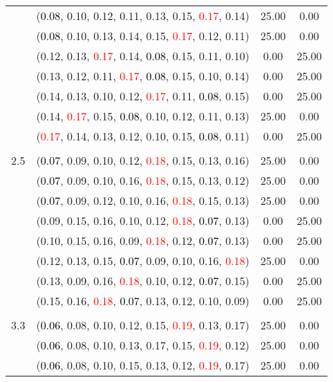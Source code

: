 \documentclass[10pt,a4paper]{report}
\begin{document}
\begin{center}
\begin{longtable}{clcc}
			&(\textcolor{black}{0.08}, 0.10, 0.12, 0.11, 0.13, 0.15, \textcolor{red}{0.17}, 0.14)&25.00&0.00\\
			&(\textcolor{black}{0.08}, 0.10, 0.13, 0.14, 0.15, \textcolor{red}{0.17}, 0.12, 0.11)&25.00&0.00\\
			&(0.12, 0.13, \textcolor{red}{0.17}, 0.14, \textcolor{black}{0.08}, 0.15, 0.11, 0.10)&0.00&25.00\\
			&(0.13, 0.12, 0.11, \textcolor{red}{0.17}, \textcolor{black}{0.08}, 0.15, 0.10, 0.14)&0.00&25.00\\
			&(0.14, 0.13, 0.10, 0.12, \textcolor{red}{0.17}, 0.11, \textcolor{black}{0.08}, 0.15)&0.00&25.00\\
			&(0.14, \textcolor{red}{0.17}, 0.15, \textcolor{black}{0.08}, 0.10, 0.12, 0.11, 0.13)&25.00&0.00\\
			&(\textcolor{red}{0.17}, 0.14, 0.13, 0.12, 0.10, 0.15, \textcolor{black}{0.08}, 0.11)&0.00&25.00\\
		&&&\\
		2.5			&(\textcolor{black}{0.07}, 0.09, 0.10, 0.12, \textcolor{red}{0.18}, 0.15, 0.13, 0.16)&25.00&0.00\\
			&(\textcolor{black}{0.07}, 0.09, 0.10, 0.16, \textcolor{red}{0.18}, 0.15, 0.13, 0.12)&25.00&0.00\\
			&(\textcolor{black}{0.07}, 0.09, 0.12, 0.10, 0.16, \textcolor{red}{0.18}, 0.15, 0.13)&25.00&0.00\\
			&(0.09, 0.15, 0.16, 0.10, 0.12, \textcolor{red}{0.18}, \textcolor{black}{0.07}, 0.13)&0.00&25.00\\
			&(0.10, 0.15, 0.16, 0.09, \textcolor{red}{0.18}, 0.12, \textcolor{black}{0.07}, 0.13)&0.00&25.00\\
			&(0.12, 0.13, 0.15, \textcolor{black}{0.07}, 0.09, 0.10, 0.16, \textcolor{red}{0.18})&25.00&0.00\\
			&(0.13, 0.09, 0.16, \textcolor{red}{0.18}, 0.10, 0.12, \textcolor{black}{0.07}, 0.15)&0.00&25.00\\
			&(0.15, 0.16, \textcolor{red}{0.18}, \textcolor{black}{0.07}, 0.13, 0.12, 0.10, 0.09)&0.00&25.00\\
		&&&\\
		3.3			&(\textcolor{black}{0.06}, 0.08, 0.10, 0.12, 0.15, \textcolor{red}{0.19}, 0.13, 0.17)&25.00&0.00\\
			&(\textcolor{black}{0.06}, 0.08, 0.10, 0.13, 0.17, 0.15, \textcolor{red}{0.19}, 0.12)&25.00&0.00\\
			&(\textcolor{black}{0.06}, 0.08, 0.10, 0.15, 0.13, 0.12, \textcolor{red}{0.19}, 0.17)&25.00&0.00\\

\end{longtable}
\end{center}
\end{document}
